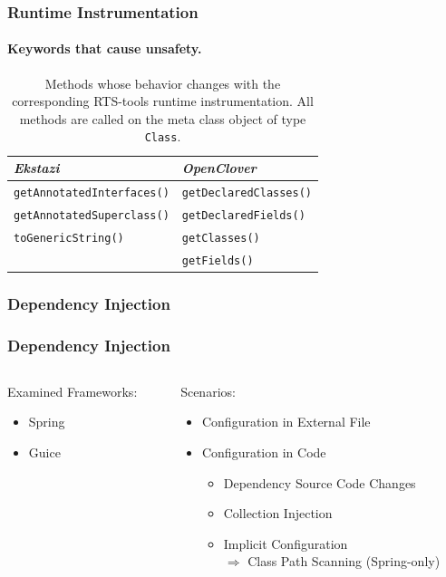 \documentclass[notes,aspectratio=169]{beamer}
\makeatletter
\newcommand{\timer}[1]{\note{S:\@#1:00\\}}
\makeatother
\begin{document}
\begin{subframe}
   \frametitle{Runtime Instrumentation}
   \framesubtitle{Keywords that cause unsafety.}
   \begin{table}[H]
      \centering
      \begin{tabular}{l | l}
         \hline
         \emph{Ekstazi}                    & \emph{OpenClover}             \\
         \hline
         \texttt{getAnnotatedInterfaces()} & \texttt{getDeclaredClasses()} \\
         \texttt{getAnnotatedSuperclass()} & \texttt{getDeclaredFields()}  \\
         \texttt{toGenericString()}        & \texttt{getClasses()}         \\
                                           & \texttt{getFields()}          \\
      \end{tabular}
      \caption{Methods whose behavior changes with the corresponding RTS-tools runtime
         instrumentation. All methods are called on the meta class object of type \nolinkurl{Class}.}
   \end{table}
\end{subframe}

\subsubsection{Dependency Injection}
\begin{subframe}
   \frametitle{Dependency Injection}
   \begin{columns}[t]
      \begin{column}{0.3\textwidth}
         Examined Frameworks:
         \begin{itemize}
            \item Spring
            \item Guice
         \end{itemize}
      \end{column}
      \begin{column}{0.6\textwidth}
         Scenarios:
         \begin{itemize}
            \item Configuration in External File
            \item Configuration in Code
                  \begin{itemize}
                     \item Dependency Source Code Changes
                     \item Collection Injection
                     \item Implicit Configuration\\$\Rightarrow$ Class Path Scanning (Spring-only)
                  \end{itemize}
         \end{itemize}
      \end{column}
   \end{columns}
   \timer{10}
\end{subframe}
\end{document}
